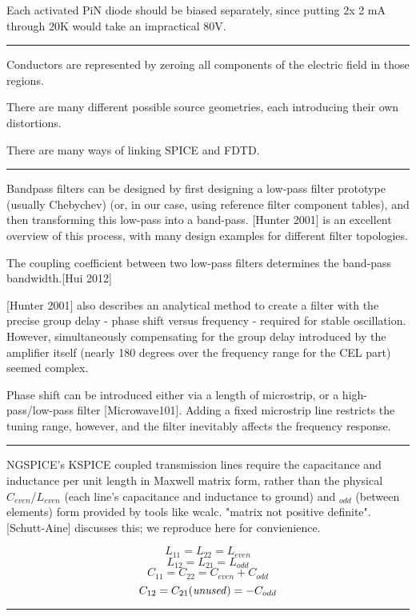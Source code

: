 \documentclass[fleqn,10pt]{article}
\begin{document}
\begin{multicols}{1}
Each activated PiN diode should be biased separately, since putting 2x 2 mA through 20K would take an impractical 80V.

\rule{\linewidth}{0.2pt}

Conductors are represented by zeroing all components of the electric field in those regions. 

There are many different possible source geometries, each introducing their own distortions.

There are many ways of linking SPICE and FDTD. 

\rule{\linewidth}{0.2pt}

Bandpass filters can be designed by first designing a low-pass filter prototype (usually Chebychev) (or, in our case, using reference filter component tables), and then transforming this low-pass into a band-pass. [Hunter 2001] is an excellent overview of this process, with many design examples for different filter topologies. 

The coupling coefficient between two low-pass filters determines the band-pass bandwidth.[Hui 2012]

[Hunter 2001] also describes an analytical method to create a filter with the precise group delay - phase shift versus frequency - required for stable oscillation. However, simultaneously compensating for the group delay introduced by the amplifier itself (nearly 180 degrees over the frequency range for the CEL part) seemed complex.

Phase shift can be introduced either via a length of microstrip, or a high-pass/low-pass filter [Microwave101]. Adding a fixed microstrip line restricts the tuning range, however, and the filter inevitably affects the frequency response.  

\rule{\linewidth}{0.2pt}

NGSPICE's KSPICE coupled transmission lines require the capacitance and inductance per unit length in Maxwell matrix form, rather than the physical $C_{even}$/$L_{even}$ (each line's capacitance and inductance to ground) and $_{odd}$ (between elements) form provided by tools like wcalc. "matrix not positive definite". [Schutt-Aine] discusses this; we reproduce here for convienience.

\[ L_{11} = L_{22} = L_{even}  \]
\[ L_{12} = L_{21} = L_{odd}  \]
\[ C_{11} = C_{22} = C_{even}+C_{odd}  \]
\[ C_{12} = C_{21} {\it{(unused)}} = -C_{odd}  \]

\rule{\linewidth}{0.2pt}




\end{multicols}
\end{document}
